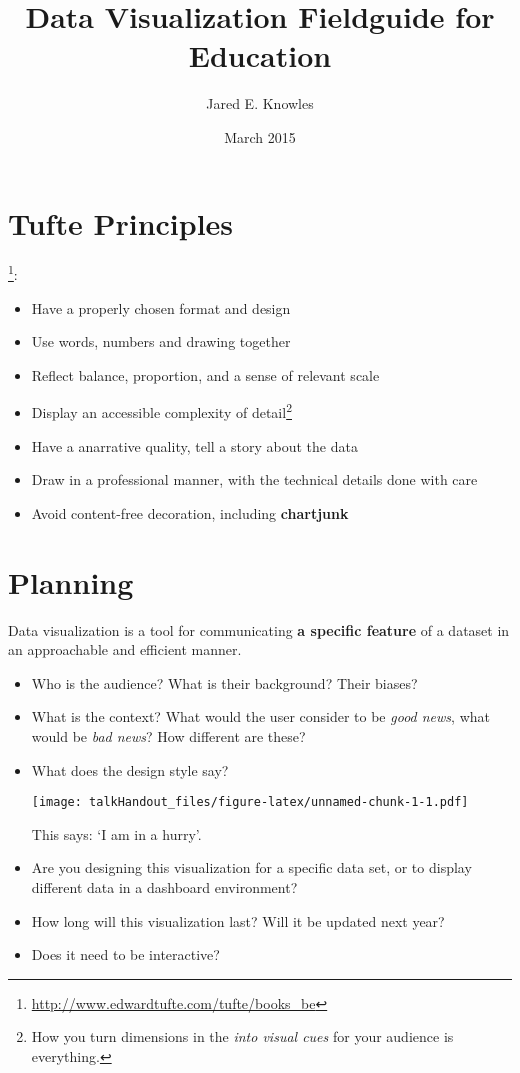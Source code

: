 \documentclass{tufte-handout}
\title{Data Visualization Fieldguide for Education}
\author{Jared E. Knowles}
\date{March 2015}
\begin{document}
\maketitle



\section{Tufte Principles}\label{tufte-principles}

 \footnote{\url{http://www.edwardtufte.com/tufte/books_be}}:

\begin{itemize}
\itemsep1pt\parskip0pt
\item
  Have a properly chosen format and design
\item
  Use words, numbers and drawing together
\item
  Reflect balance, proportion, and a sense of relevant scale
\item
  Display an accessible complexity of detail\footnote{How you turn
    dimensions in the \emph{into visual cues} for your audience is
    everything.}
\item
  Have a anarrative quality, tell a story about the data
\item
  Draw in a professional manner, with the technical details done with
  care
\item
  Avoid content-free decoration, including \textbf{chartjunk}
\end{itemize}

\section{Planning}\label{planning}

Data visualization is a tool for communicating \textbf{a specific
feature} of a dataset in an approachable and efficient
manner.

\begin{itemize}
\itemsep1pt\parskip0pt
\item
  Who is the audience? What is their background? Their biases?
\item
  What is the context? What would the user consider to be \emph{good
  news}, what would be \emph{bad news}? How different are these?
\item
  What does the design style say?

  \begin{marginfigure}
   \texttt{[image: talkHandout\_files/figure-latex/unnamed-chunk-1-1.pdf]}
  \caption{This says: `I am in a hurry'.}
  \end{marginfigure}
\item
  Are you designing this visualization for a specific data set, or to
  display different data in a dashboard environment?
\item
  How long will this visualization last? Will it be updated next year?
\item
  Does it need to be interactive?
\end{itemize}
\end{document}
